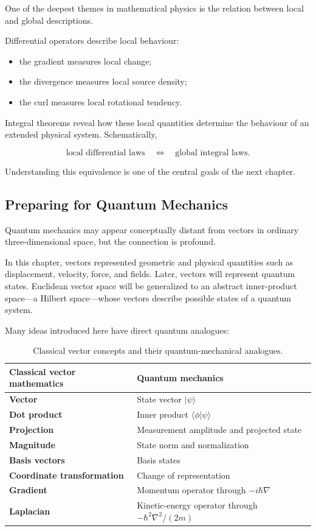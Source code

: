 One of the deepest themes in mathematical physics is the relation between local
and global descriptions.

Differential operators describe local behaviour:

\begin{itemize}
\item the gradient measures local change;
\item the divergence measures local source density;
\item the curl measures local rotational tendency.
\end{itemize}

Integral theorems reveal how these local quantities determine the behaviour of
an extended physical system. Schematically,

\[
\boxed{
\text{local differential laws}
\quad\Longleftrightarrow\quad
\text{global integral laws}.
}
\]

Understanding this equivalence is one of the central goals of the next chapter.

\subsection{Preparing for Quantum Mechanics}

Quantum mechanics may appear conceptually distant from vectors in ordinary
three-dimensional space, but the connection is profound.

In this chapter, vectors represented geometric and physical quantities such as
displacement, velocity, force, and fields. Later, vectors will represent
quantum states. Euclidean vector space will be generalized to an abstract
inner-product space---a Hilbert space---whose vectors describe possible states
of a quantum system.

Many ideas introduced here have direct quantum analogues:

\begin{table}[htbp]
\centering
\caption{Classical vector concepts and their quantum-mechanical analogues.}
\label{tab:classical-quantum-correspondence}
\begin{tabularx}{0.94\textwidth}{@{}>{\bfseries}p{}X@{}}
\toprule
Classical vector mathematics & Quantum mechanics \\
\midrule
Vector & State vector $|\psi\rangle$ \\
Dot product & Inner product $\langle\phi|\psi\rangle$ \\
Projection & Measurement amplitude and projected state \\
Magnitude & State norm and normalization \\
Basis vectors & Basis states \\
Coordinate transformation & Change of representation \\
Gradient & Momentum operator through $-i\hbar\nabla$ \\
Laplacian & Kinetic-energy operator through $-\hbar^2\nabla^2/(2m)$ \\
\bottomrule
\end{tabularx}
\end{table}

